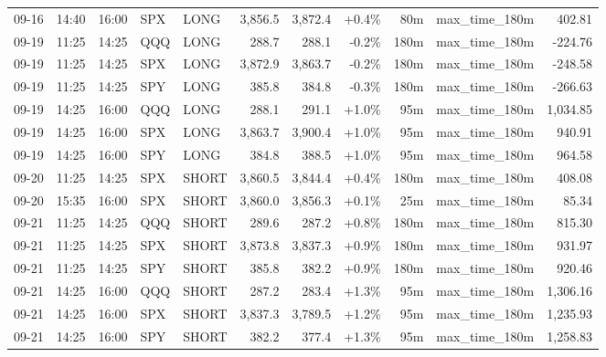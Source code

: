 \documentclass[11pt,a4paper,twoside]{article}
\begin{document}
\begin{center}
\begin{longtable}{>{\color{txtmain}}l l l l l r r r r >{\color{txtmain}}l r}
09-16 & 14:40 & 16:00 & SPX & LONG & 3,856.5 & 3,872.4 & \textcolor{wingreen}{+0.4\%} & 80m & max\_time\_180m & \textcolor{wingreen}{402.81} \\
09-19 & 11:25 & 14:25 & QQQ & LONG & 288.7 & 288.1 & \textcolor{lossred}{-0.2\%} & 180m & max\_time\_180m & \textcolor{lossred}{-224.76} \\
09-19 & 11:25 & 14:25 & SPX & LONG & 3,872.9 & 3,863.7 & \textcolor{lossred}{-0.2\%} & 180m & max\_time\_180m & \textcolor{lossred}{-248.58} \\
09-19 & 11:25 & 14:25 & SPY & LONG & 385.8 & 384.8 & \textcolor{lossred}{-0.3\%} & 180m & max\_time\_180m & \textcolor{lossred}{-266.63} \\
09-19 & 14:25 & 16:00 & QQQ & LONG & 288.1 & 291.1 & \textcolor{wingreen}{+1.0\%} & 95m & max\_time\_180m & \textcolor{wingreen}{1,034.85} \\
09-19 & 14:25 & 16:00 & SPX & LONG & 3,863.7 & 3,900.4 & \textcolor{wingreen}{+1.0\%} & 95m & max\_time\_180m & \textcolor{wingreen}{940.91} \\
09-19 & 14:25 & 16:00 & SPY & LONG & 384.8 & 388.5 & \textcolor{wingreen}{+1.0\%} & 95m & max\_time\_180m & \textcolor{wingreen}{964.58} \\
09-20 & 11:25 & 14:25 & SPX & SHORT & 3,860.5 & 3,844.4 & \textcolor{wingreen}{+0.4\%} & 180m & max\_time\_180m & \textcolor{wingreen}{408.08} \\
09-20 & 15:35 & 16:00 & SPX & SHORT & 3,860.0 & 3,856.3 & \textcolor{wingreen}{+0.1\%} & 25m & max\_time\_180m & \textcolor{wingreen}{85.34} \\
09-21 & 11:25 & 14:25 & QQQ & SHORT & 289.6 & 287.2 & \textcolor{wingreen}{+0.8\%} & 180m & max\_time\_180m & \textcolor{wingreen}{815.30} \\
09-21 & 11:25 & 14:25 & SPX & SHORT & 3,873.8 & 3,837.3 & \textcolor{wingreen}{+0.9\%} & 180m & max\_time\_180m & \textcolor{wingreen}{931.97} \\
09-21 & 11:25 & 14:25 & SPY & SHORT & 385.8 & 382.2 & \textcolor{wingreen}{+0.9\%} & 180m & max\_time\_180m & \textcolor{wingreen}{920.46} \\
09-21 & 14:25 & 16:00 & QQQ & SHORT & 287.2 & 283.4 & \textcolor{wingreen}{+1.3\%} & 95m & max\_time\_180m & \textcolor{wingreen}{1,306.16} \\
09-21 & 14:25 & 16:00 & SPX & SHORT & 3,837.3 & 3,789.5 & \textcolor{wingreen}{+1.2\%} & 95m & max\_time\_180m & \textcolor{wingreen}{1,235.93} \\
09-21 & 14:25 & 16:00 & SPY & SHORT & 382.2 & 377.4 & \textcolor{wingreen}{+1.3\%} & 95m & max\_time\_180m & \textcolor{wingreen}{1,258.83} \\

\end{longtable}
\end{center}
\end{document}

